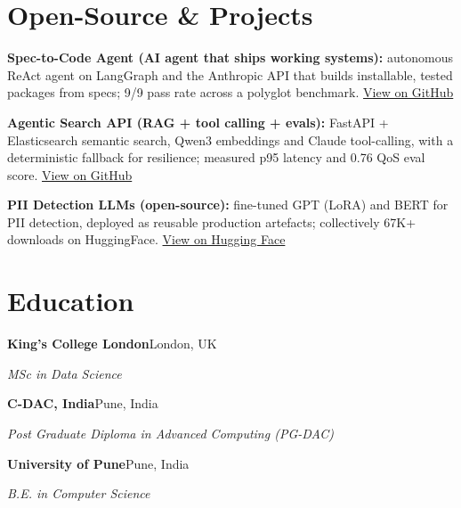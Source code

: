 \documentclass[10pt,a4paper]{article}
\begin{document}
\section{Open-Source \& Projects}
\begin{tight}
  \item \textbf{Spec-to-Code Agent (AI agent that ships working systems):} autonomous ReAct agent on LangGraph and the Anthropic API that builds installable, tested packages from specs; 9/9 pass rate across a polyglot benchmark. \href{https://github.com/abhijeetscode/Spec-to-Code-Agent}{View on GitHub}
  \item \textbf{Agentic Search API (RAG + tool calling + evals):} FastAPI + Elasticsearch semantic search, Qwen3 embeddings and Claude tool-calling, with a deterministic fallback for resilience; measured p95 latency and 0.76 QoS eval score. \href{https://github.com/abhijeetscode/search-agent}{View on GitHub}
  \item \textbf{PII Detection LLMs (open-source):} fine-tuned GPT (LoRA) and BERT for PII detection, deployed as reusable production artefacts; collectively 67K+ downloads on HuggingFace. \href{https://huggingface.co/ab-ai/pii_model}{View on Hugging Face}
\end{tight}

\section{Education}
{\color{company}\bfseries King's College London}\hfill {\color{muted}London, UK}\par
{\itshape MSc in Data Science}\par\vspace{2pt}
{\color{company}\bfseries C-DAC, India}\hfill {\color{muted}Pune, India}\par
{\itshape Post Graduate Diploma in Advanced Computing (PG-DAC)}\par\vspace{2pt}
{\color{company}\bfseries University of Pune}\hfill {\color{muted}Pune, India}\par
{\itshape B.E. in Computer Science}\par
\end{document}
